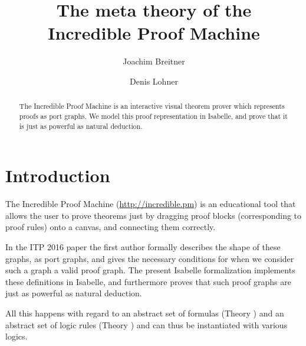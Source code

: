 \documentclass[11pt,a4paper,parskip=half]{scrartcl}
\begin{document}
\title{The meta theory of the\\ Incredible Proof Machine}
\author{Joachim Breitner \and Denis Lohner}
\maketitle

\begin{abstract}
\noindent
The Incredible Proof Machine is an interactive visual theorem prover which represents proofs as
port graphs. We model this proof representation in Isabelle, and prove that it is just
as powerful as natural deduction.
\end{abstract}

\tableofcontents

\section{Introduction}

The Incredible Proof Machine (\url{http://incredible.pm}) is an educational tool that allows the user to
prove theorems just by dragging proof blocks (corresponding to proof rules) onto a canvas, and connecting them
correctly.

In the ITP 2016 paper \cite{incredible} the first author formally describes the
shape of these graphs, as port graphs, and gives the necessary conditions for
when we consider such a graph a valid proof graph. The present Isabelle
formalization implements these definitions in Isabelle, and furthermore proves
that such proof graphs are just as powerful as natural deduction.

All this happens with regard to an abstract set of formulas (Theory
) and an abstract set of logic rules (Theory
) and can thus be instantiated with various logics.
\end{document}
